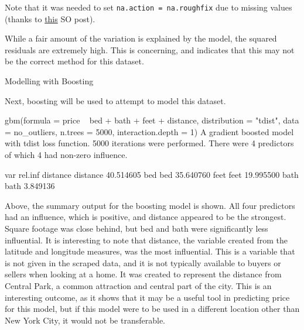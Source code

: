 \documentclass[11pt, a4paper]{article}
\begin{document}
Note that it was needed to set \texttt{na.action = na.roughfix} due to missing values (thanks to \href{https://stackoverflow.com/questions/8370455/how-to-use-random-forests-in-r-with-missing-values}{this} SO post). 

While a fair amount of the variation is explained by the model, the squared residuals are extremely high. This is concerning, and indicates that this may not be the correct method for this dataset. 

\pagebreak
Modelling with Boosting
\par
Next, boosting will be used to attempt to model this dataset.

\begin{Schunk}
\begin{Soutput}
gbm(formula = price ~ bed + bath + feet + distance, distribution = "tdist", 
    data = no_outliers, n.trees = 5000, interaction.depth = 1)
A gradient boosted model with tdist loss function.
5000 iterations were performed.
There were 4 predictors of which 4 had non-zero influence.
\end{Soutput}
\begin{Soutput}
              var   rel.inf
distance distance 40.514605
bed           bed 35.640760
feet         feet 19.995500
bath         bath  3.849136
\end{Soutput}
\end{Schunk}

Above, the summary output for the boosting model is shown. All four predictors had an influence, which is positive, and distance appeared to be the strongest. Square footage was close behind, but bed and bath were significantly less influential. It is interesting to note that distance, the variable created from the latitude and longitude measures, was the most influential. This is a variable that is not given in the scraped data, and it is not typically available to buyers or sellers when looking at a home. It was created to represent the distance from Central Park, a common attraction and central part of the city. This is an interesting outcome, as it shows that it may be a useful tool in predicting price for this model, but if this model were to be used in a different location other than New York City, it would not be transferable.

\vspace{2pc}
\end{document}
